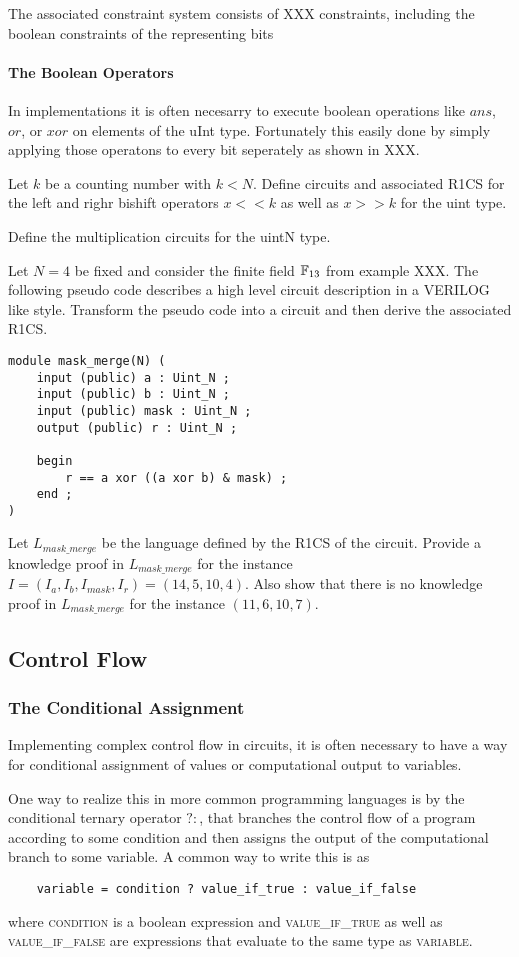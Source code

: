 The associated constraint system consists of XXX constraints, including the boolean constraints of the representing bits
\paragraph{The Boolean Operators} In implementations it is often necesarry to execute boolean operations like $ans$, $or$, or $xor$ on elements of the uInt type. Fortunately this easily done by simply applying those operatons to every bit seperately as shown in XXX.  
\begin{exercise}
Let $k$ be a counting number with $k<N$. Define circuits and associated R1CS for the left and righr bishift operators $x<<k$ as well as $x>>k$ for the uint type. 
\end{exercise}
\begin{exercise}
Define the multiplication circuits for the uintN type.
\end{exercise}
\begin{exercise} Let $N=4$ be fixed and consider the finite field $\mathbb{F}_{13}$ from example XXX. The following pseudo code describes a high level circuit description in a VERILOG like style. Transform the pseudo code into a circuit and then derive the associated R1CS. 
\begin{lstlisting}
module mask_merge(N) (
	input (public) a : Uint_N ;
	input (public) b : Uint_N ;
	input (public) mask : Uint_N ;
	output (public) r : Uint_N ;

	begin
		r == a xor ((a xor b) & mask) ;
	end ;
)
\end{lstlisting}
Let $L_{mask\_merge}$ be the language defined by the R1CS of the circuit. Provide a knowledge proof in $L_{mask\_merge}$ for the instance $I=(I_a, I_b, I_{mask}, I_r) = (14, 5, 10, 4)$. Also show that there is no knowledge proof in $L_{mask\_merge}$ for the instance $(11, 6, 10, 7)$.
\end{exercise}
\subsection{Control Flow}
\subsubsection{The Conditional Assignment} Implementing complex control flow in circuits, it is often necessary to have a way for conditional assignment of values or computational output to variables.

One way to realize this in more common programming languages is by the conditional ternary operator $?:$, that branches the control flow of a program according to some condition and then assigns the output of the computational branch to some variable. A common way to write this is as
\begin{lstlisting}
	variable = condition ? value_if_true : value_if_false  
\end{lstlisting}
where \textsc{condition} is a boolean expression and \textsc{value\_if\_true} as well as \textsc{value\_if\_false} are expressions that evaluate to the same type as \textsc{variable}.

